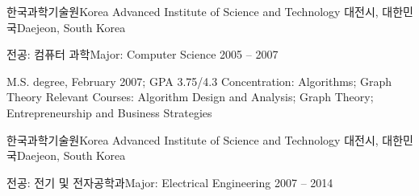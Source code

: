 \documentclass[english,representative]{resume_structure}
\begin{document}
\begin{Education}
\ResumeSectionWithSubSection %
{한국과학기술원}{Korea Advanced Institute of Science and Technology}
{대전시, 대한민국}{Daejeon, South Korea} 
{
  \ResumeSubSection %
  {전공: 컴퓨터 과학}{Major: Computer Science}
  {2005 -- 2007}
  {
  \begin{itemize}
  \end{itemize}
  }{
  \begin{itemize}
     {M.S. degree, February 2007; GPA 3.75/4.3}
     {Concentration: Algorithms; Graph Theory}
     {Relevant Courses: Algorithm Design and Analysis; Graph Theory; Entrepreneurship and Business Strategies}
  \end{itemize}
  }
}
\ResumeSectionWithSubSection %
{한국과학기술원}{Korea Advanced Institute of Science and Technology}
{대전시, 대한민국}{Daejeon, South Korea} 
{
  \ResumeSubSection %
  {전공: 전기 및 전자공학과}{Major: Electrical Engineering}
  {2007 -- 2014}
  {
  \begin{itemize}
  \end{itemize}
  }{
  \begin{itemize}
  \end{itemize}
  }
}
\end{Education}
\end{document}
